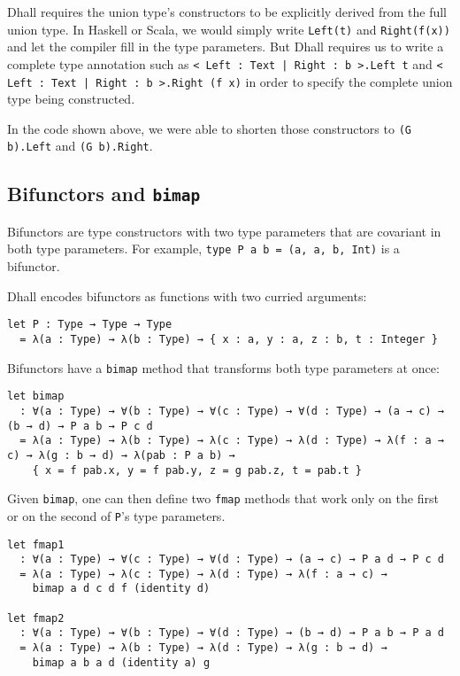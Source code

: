 Dhall requires the union type's constructors to be explicitly derived from the full union type.
In Haskell or Scala, we would simply write \lstinline!Left(t)! and \lstinline!Right(f(x))! and let the compiler fill in the type parameters.
But Dhall requires us to write a complete type annotation such as \lstinline!< Left : Text | Right : b >.Left t! and \lstinline!< Left : Text | Right : b >.Right (f x)! in order to specify the complete union type being constructed.


In the code shown above, we were able to shorten those constructors to \lstinline!(G b).Left! and \lstinline!(G b).Right!.


\subsection{Bifunctors and \lstinline!bimap!}


Bifunctors are type constructors with two type parameters that are covariant in both type parameters.
For example, \lstinline!type P a b = (a, a, b, Int)! is a bifunctor.


Dhall encodes bifunctors as functions with two curried arguments:


\begin{lstlisting}[language=Dhall]
let P : Type → Type → Type
  = λ(a : Type) → λ(b : Type) → { x : a, y : a, z : b, t : Integer }
\end{lstlisting}


Bifunctors have a \lstinline!bimap! method that transforms both type parameters at once:


\begin{lstlisting}[language=Dhall]
let bimap
  : ∀(a : Type) → ∀(b : Type) → ∀(c : Type) → ∀(d : Type) → (a → c) → (b → d) → P a b → P c d
  = λ(a : Type) → λ(b : Type) → λ(c : Type) → λ(d : Type) → λ(f : a → c) → λ(g : b → d) → λ(pab : P a b) →
    { x = f pab.x, y = f pab.y, z = g pab.z, t = pab.t }
\end{lstlisting}


Given \lstinline!bimap!, one can then define two \lstinline!fmap! methods that work only on the first or on the second of \lstinline!P!'s type parameters.


\begin{lstlisting}[language=Dhall]
let fmap1
  : ∀(a : Type) → ∀(c : Type) → ∀(d : Type) → (a → c) → P a d → P c d
  = λ(a : Type) → λ(c : Type) → λ(d : Type) → λ(f : a → c) →
    bimap a d c d f (identity d)

let fmap2
  : ∀(a : Type) → ∀(b : Type) → ∀(d : Type) → (b → d) → P a b → P a d
  = λ(a : Type) → λ(b : Type) → λ(d : Type) → λ(g : b → d) →
    bimap a b a d (identity a) g
\end{lstlisting}


